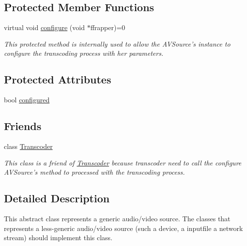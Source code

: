 \subsection*{Protected Member Functions}
\begin{DoxyCompactItemize}
\item 
virtual void \hyperlink{classbr_1_1ufscar_1_1lince_1_1xpta_1_1streaming_1_1AVSource_a35f8e70290dafd5ad952f54c3bc44ce3}{configure} (void $\ast$ffrapper)=0
\begin{DoxyCompactList}\small\item\em This protected method is internally used to allow the AVSource's instance to configure the transcoding process with her parameters. \item\end{DoxyCompactList}\end{DoxyCompactItemize}
\subsection*{Protected Attributes}
\begin{DoxyCompactItemize}
\item 
bool \hyperlink{classbr_1_1ufscar_1_1lince_1_1xpta_1_1streaming_1_1AVSource_a537e2164b07ff77a0a2a1c4c3154aa8f}{configured}
\end{DoxyCompactItemize}
\subsection*{Friends}
\begin{DoxyCompactItemize}
\item 
class \hyperlink{classbr_1_1ufscar_1_1lince_1_1xpta_1_1streaming_1_1AVSource_af9f366fbe5cbc06f38791f120c62c182}{Transcoder}
\begin{DoxyCompactList}\small\item\em This class is a friend of \hyperlink{classbr_1_1ufscar_1_1lince_1_1xpta_1_1streaming_1_1Transcoder}{Transcoder} because transcoder need to call the configure AVSource's method to processed with the transcoding process. \item\end{DoxyCompactList}\end{DoxyCompactItemize}


\subsection{Detailed Description}
This abstract class represents a generic audio/video source. The classes that represents a less-\/generic audio/video source (such a device, a inputfile a network stream) should implement this class. 

